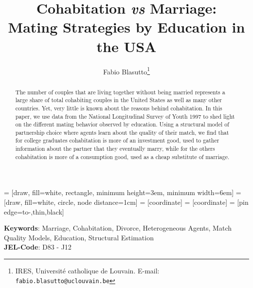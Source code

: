 \documentclass[12pt]{article}
\title{Cohabitation \textit{vs} Marriage:\\ Mating Strategies by Education in the USA}
\author{Fabio Blasutto\thanks{IRES, Université catholique de Louvain. E-mail: \tt{fabio.blasutto@uclouvain.be}}}
\begin{document}

 	 = [draw, fill=white, rectangle, 
 	minimum height=3em, minimum width=6em]
 	 = [draw, fill=white, circle, node distance=1cm]
 	 = [coordinate]
 	 = [coordinate]
 	 = [pin edge={to-,thin,black}]
 	
 	



	\maketitle
\begin{abstract}
The number of couples that are living together without being married represents a large share of total cohabiting couples in the United States as well as many other countries. Yet, very little is known about the reasons behind cohabitation. In this paper, we use data from the National Longitudinal Survey of Youth 1997 to shed light on the different mating behavior observed by education. Using a structural model of partnership choice where agents learn about the quality of their match, we find that for college graduates cohabitation is more of an investment good, used to gather information about the partner that they eventually marry, while for the others cohabitation is more of a consumption good, used as a cheap substitute of marriage.
\end{abstract}
\textbf{Keywords}: Marriage, Cohabitation, Divorce, Heterogeneous Agents, Match Quality Models,  Education, Structural Estimation\\
\textbf{JEL-Code}: D83 - J12 
\noindent \medskip{}
\end{document}
